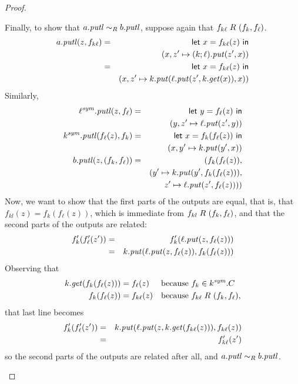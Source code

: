 \begin{defn}[$R$-similarity]
\begin{theorem}
\begin{lemma}
\begin{theorem}[No products]
\begin{lemma}
\begin{defn}
\begin{theorem}
\begin{theorem}
\begin{corollary}[Hylomorphism]
\begin{defn}
\begin{defn}
\begin{defn}[Symmetrization]
\begin{proof}
\begin{longenum}
Finally, to show that $a.\mathit{putl} \sim_R b.\mathit{putl}$, suppose again that
$f_{k\ell}\mathrel{R_{}}(f_k,f_\ell)$.
\begin{eqnarray*}
    a.\mathit{putl}(z,f_{k\ell})
    &=& \mathsf{let}\  x = f_{k\ell}(z) \ \mathsf{in} \\
    & & (x,z'\mapsto(k;\ell).\mathit{put}(z',x)) \\
    &=& \mathsf{let}\  x = f_{k\ell}(z) \ \mathsf{in} \\
    & & (x,z' \mapsto k.\mathit{put}(\ell.\mathit{put}(z',k.\mathit{get}(x)),x))
\end{eqnarray*}
Similarly,
\begin{eqnarray*}
    \ell^\mathit{sym}.\mathit{putl}(z,f_\ell)
    &=& \mathsf{let}\  y = f_\ell(z) \ \mathsf{in} \\
    & & (y,z' \mapsto \ell.\mathit{put}(z',y)) \\
    k^\mathit{sym}.\mathit{putl}(f_\ell(z),f_k)
    &=& \mathsf{let}\  x = f_k(f_\ell(z)) \ \mathsf{in} \\
    & & (x,y' \mapsto k.\mathit{put}(y',x)) \\
    b.\mathit{putl}(z,(f_k,f_\ell))
    &=& (f_k(f_\ell(z)), \\
    & & (y' \mapsto k.\mathit{put}(y',f_k(f_\ell(z))), \\
    & & z' \mapsto \ell.\mathit{put}(z',f_\ell(z))))
\end{eqnarray*}
Now, we want to show that the first parts of the outputs are equal, that is,
that $f_{kl}(z) = f_k(f_\ell(z))$, which is immediate from
$f_{kl}\mathrel{R_{}}(f_k,f_\ell)$, and that the second parts of the outputs are
related:
\begin{eqnarray*}
    f_k'(f_\ell'(z')) &=& f_k'(\ell.\mathit{put}(z,f_\ell(z))) \\
    &=& k.\mathit{put}(\ell.\mathit{put}(z,f_\ell(z)),f_k(f_\ell(z)))
\end{eqnarray*}
Observing that
\begin{align*}
    k.\mathit{get}(f_k(f_\ell(z))) &= f_\ell(z) && \mbox{because }f_k \in k^\mathit{sym}.C \\
    f_k(f_\ell(z)) &= f_{k\ell}(z) && \mbox{because }f_{k\ell} \mathrel{R_{}}(f_k,f_\ell),
\end{align*}
that last line becomes
\begin{eqnarray*}
    f_k'(f_\ell'(z'))
    &=& k.\mathit{put}(\ell.\mathit{put}(z,k.\mathit{get}(f_{k\ell}(z))),f_{k\ell}(z)) \\
    &=& f_{k\ell}'(z')
\end{eqnarray*}
so the second parts of the outputs are related after all, and $a.\mathit{putl}
\sim_R b.\mathit{putl}$.


\end{longenum}
\end{proof}
\end{defn}
\end{defn}
\end{defn}
\end{corollary}
\end{theorem}
\end{theorem}
\end{defn}
\end{lemma}
\end{theorem}
\end{lemma}
\end{theorem}
\end{defn}
